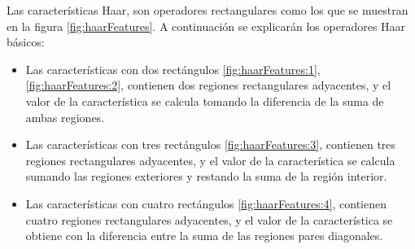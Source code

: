 Las características Haar, son operadores rectangulares como los que se muestran en la figura \ref{fig:haarFeatures}. A continuación se explicarán los operadores Haar básicos:
\begin{itemize}
\item Las características con dos rectángulos \ref{fig:haarFeatures:1}, \ref{fig:haarFeatures:2}, contienen dos regiones rectangulares adyacentes, y el valor de la característica se calcula tomando la diferencia de la suma de ambas regiones. 

\item Las características con tres rectángulos \ref{fig:haarFeatures:3}, contienen tres regiones rectangulares adyacentes, y el valor de la característica se calcula sumando las regiones exteriores y restando la suma de la región interior.

\item Las características con cuatro rectángulos \ref{fig:haarFeatures:4}, contienen cuatro regiones rectangulares adyacentes, y el valor de la característica se obtiene con la diferencia entre la suma de las regiones pares diagonales.
\end{itemize} 

